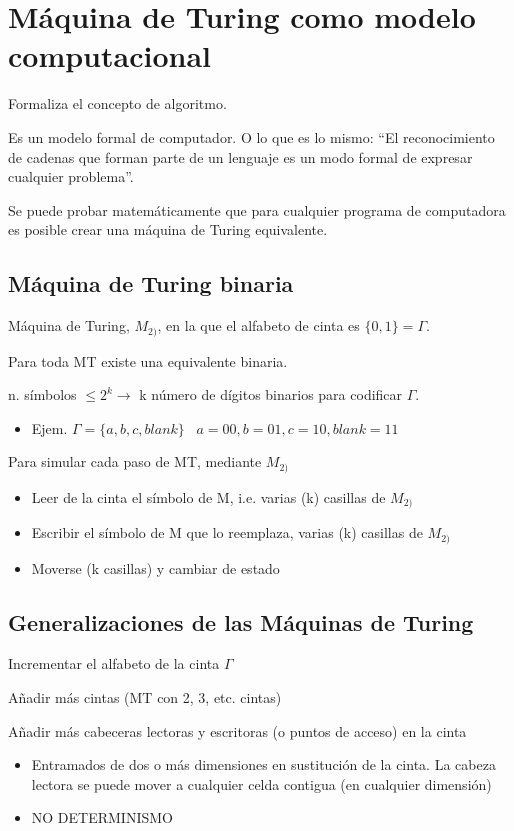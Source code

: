 \section{Máquina de Turing como modelo computacional}
Formaliza el concepto de algoritmo.

Es un modelo formal de computador. O lo que es lo mismo: \enquote{El reconocimiento de cadenas que forman parte de un lenguaje es un modo formal de expresar cualquier problema}.

Se puede probar matemáticamente que para cualquier programa de computadora es posible crear una máquina de Turing equivalente.

\subsection{Máquina de Turing binaria}
Máquina de Turing, $M_{2)}$, en la que el alfabeto de cinta es $\{0,1\}=\Gamma$.

Para toda MT existe una equivalente binaria.

n. símbolos $\leq 2^k \rightarrow$ k número de dígitos binarios para codificar $\Gamma$.
\begin{itemize}
	\item Ejem. $\Gamma = \{a, b, c, blank \}\;\;\; a=00, b=01, c=10, \textit{blank}=11$
\end{itemize}

Para simular cada paso de MT, mediante $M_{2)}$
\begin{itemize}
	\item Leer de la cinta el símbolo de M, i.e. varias (k) casillas de $M_{2)}$
	\item Escribir el símbolo de M que lo reemplaza, varias (k) casillas de $M_{2)}$
	\item Moverse (k casillas) y cambiar de estado
\end{itemize}

\subsection{Generalizaciones de las Máquinas de Turing}
Incrementar el alfabeto de la cinta $\Gamma$

Añadir más cintas (MT con 2, 3, etc. cintas)

Añadir más cabeceras lectoras y escritoras (o puntos de acceso) en la cinta
\begin{itemize}
	\item Entramados de dos o más dimensiones en sustitución de la cinta. La cabeza lectora se puede mover a cualquier celda contigua (en cualquier dimensión)
	\item NO DETERMINISMO
\end{itemize}

